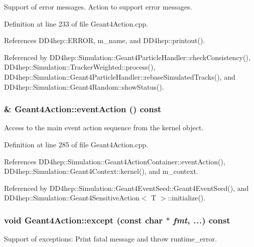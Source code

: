 Support of error messages. Action to support error messages. 

Definition at line 233 of file Geant4Action.cpp.

References DD4hep::ERROR, m\_\-name, and DD4hep::printout().

Referenced by DD4hep::Simulation::Geant4ParticleHandler::checkConsistency(), DD4hep::Simulation::TrackerWeighted::process(), DD4hep::Simulation::Geant4ParticleHandler::rebaseSimulatedTracks(), and DD4hep::Simulation::Geant4Random::showStatus().\hypertarget{class_d_d4hep_1_1_simulation_1_1_geant4_action_a5ac8a0e311d6f5b7d297de21dfcd56a7}{
\subsubsection[{eventAction}]{ \& Geant4Action::eventAction () const}}
\label{class_d_d4hep_1_1_simulation_1_1_geant4_action_a5ac8a0e311d6f5b7d297de21dfcd56a7}


Access to the main event action sequence from the kernel object. 

Definition at line 285 of file Geant4Action.cpp.

References DD4hep::Simulation::Geant4ActionContainer::eventAction(), DD4hep::Simulation::Geant4Context::kernel(), and m\_\-context.

Referenced by DD4hep::Simulation::Geant4EventSeed::Geant4EventSeed(), and DD4hep::Simulation::Geant4SensitiveAction$<$ T $>$::initialize().\hypertarget{class_d_d4hep_1_1_simulation_1_1_geant4_action_a05d5b6e6de246d0b7a7d76f66b9dc608}{
\subsubsection[{except}]{\setlength{\rightskip}{0pt plus 5cm}void Geant4Action::except (const char $\ast$ {\em fmt}, \/   {\em ...}) const}}
\label{class_d_d4hep_1_1_simulation_1_1_geant4_action_a05d5b6e6de246d0b7a7d76f66b9dc608}


Support of exceptions: Print fatal message and throw runtime\_\-error. 

